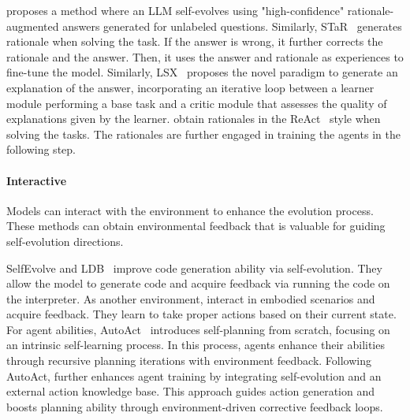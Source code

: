 \documentclass[sn-basic, Numbered]{sn-jnl}%
\theoremstyle{thmstyleone}%
\theoremstyle{thmstyletwo}%
\theoremstyle{thmstylethree}%
\begin{document}
\citet{huang2022large} proposes a method where an LLM self-evolves using "high-confidence" rationale-augmented answers generated for unlabeled questions. 
Similarly, STaR~\cite{zelikman2022star} generates rationale when solving the task. If the answer is wrong, it further corrects the rationale and the answer. Then, it uses the answer and rationale as experiences to fine-tune the model.
Similarly, LSX~\cite{stammer2023learning} proposes the novel paradigm to generate an explanation of the answer, incorporating an iterative loop between a learner module performing a base task and a critic module that assesses the quality of explanations given by the learner. 
\citet{song2024trial, yang2024react} obtain rationales in the ReAct~\cite{yao2022react} style when solving the tasks. The rationales are further engaged in training the agents in the following step.


\noindent\paragraph{Interactive}
Models can interact with the environment to enhance the evolution process.
These methods can obtain environmental feedback that is valuable for guiding self-evolution directions. 


SelfEvolve and LDB~\cite{jiang2023selfevolve, zhong2024ldb} improve code generation ability via self-evolution. They allow the model to generate code and acquire feedback via running the code on the interpreter. 
As another environment, \citet{song2024trial, yang2024react} interact in embodied scenarios and acquire feedback. They learn to take proper actions based on their current state.
For agent abilities, AutoAct~\cite{qiao2024autoact} introduces self-planning from scratch, focusing on an intrinsic self-learning process. In this process, agents enhance their abilities through recursive planning iterations with environment feedback.
Following AutoAct, \cite{zhu2024knowagent} further enhances agent training by integrating self-evolution and an external action knowledge base. This approach guides action generation and boosts planning ability through environment-driven corrective feedback loops.
\end{document}
